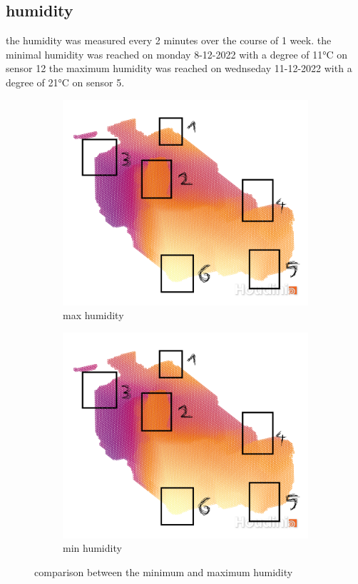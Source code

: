 \subsection{humidity} 
the humidity was measured every 2 minutes over the course of 1 week. the minimal humidity was reached on monday 8-12-2022 with a degree of 11°C on sensor 12 the maximum humidity was reached on wednseday 11-12-2022 with a degree of 21°C on sensor 5.\\ 
\begin{figure}[hbt!] 
   \begin{subfigure}{0.5\textwidth} 
        \includegraphics[width=0.99\linewidth]{reports/current_report/images/max_humidity.png}  
        \caption{max humidity}  
    \end{subfigure} 
    \begin{subfigure}{0.5\textwidth} 
       \includegraphics[width=0.99\linewidth]{reports/current_report/images/min_humidity.png}  
       \caption{min humidity}  
    \end{subfigure} 
\caption{comparison between the minimum and maximum  humidity}  
\end{figure} 
